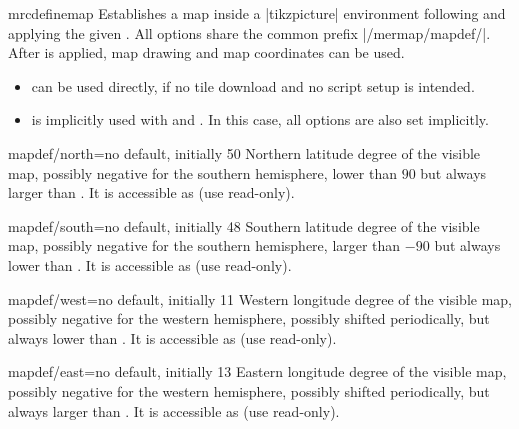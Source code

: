 \begin{docCommand}{mrcdefinemap}{}
  Establishes a map inside a |tikzpicture| environment following
  and applying the given .
  All options share the common prefix |/mermap/mapdef/|.
  After  is applied, map drawing and map coordinates
  can be used.
  \begin{itemize}
  \item{} can be used directly, if no tile download
    and no script setup is intended.
  \item{} is implicitly used with
     and . In this case, all options are
    also set implicitly.
  \end{itemize}
\end{docCommand}


\begin{docMrcKey}{mapdef/north}{=}{no default, initially 50}
  Northern latitude degree of the visible map, possibly negative for the southern hemisphere,
  lower than $90$ but always larger than .
  It is accessible as  (use read-only).
\end{docMrcKey}

\begin{docMrcKey}{mapdef/south}{=}{no default, initially 48}
  Southern latitude degree of the visible map, possibly negative for the southern hemisphere,
  larger than $-90$ but always lower than .
  It is accessible as  (use read-only).
\end{docMrcKey}

\begin{docMrcKey}{mapdef/west}{=}{no default, initially 11}
  Western longitude degree of the visible map, possibly negative for the western hemisphere,
  possibly shifted periodically, but always lower than .
  It is accessible as  (use read-only).
\end{docMrcKey}

\begin{docMrcKey}{mapdef/east}{=}{no default, initially 13}
  Eastern longitude degree of the visible map, possibly negative for the western hemisphere,
  possibly shifted periodically, but always larger than .
  It is accessible as  (use read-only).
\end{docMrcKey}


